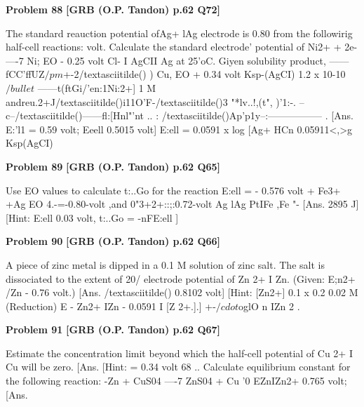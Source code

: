 \begin{problembox}
\textbf{Problem 88} \hfill \textbf{[GRB (O.P. Tandon) p.62 Q72]}
\label{q:ext-grb_all_questions-88}

The standard reauction potential ofAg+ lAg electrode is 0.80 
from the followirig half-cell reactions: 
volt. 
Calculate 
the 
standard 
electrode' potential 
of 
Ni2+ + 2e- ----7 Ni; 
EO 
- 0.25 volt 
Cl- I AgCII Ag 
at 
25'oC. 
Giyen 
solubility 
product, 
------fCC'ffUZ$/pm$+-2/textasciitilde() ) Cu, 
EO 
+ 0.34 volt 
Ksp-(AgCI) 
1.2 x 10-10$/bullet$ 
------t(ftGi/'en:1Ni:2+] \underline{\hspace{1cm}} 1 M andreu.2+J/textasciitilde()i11O'F-/textasciitilde()3 
"*lv..!,(t", )'1:-. --c--/textasciitilde()------fl:[Hnl"'nt .. 
: /textasciitilde()Ap'p1y--:-----------------
. [Ans. E:'l1 = 0.59 volt; Eeell 
0.5015 volt] 
E:ell = 0.0591 x log [Ag+ HCn 0.05911<,>g Ksp(AgCI)
\end{problembox}

\begin{problembox}
\textbf{Problem 89} \hfill \textbf{[GRB (O.P. Tandon) p.62 Q65]}
\label{q:ext-grb_all_questions-89}

Use EO values to calculate t:..Go for the reaction 
E:ell = - 0.576 volt 
+ 
Fe3+ +Ag 
EO 4.-=-0.80-volt ,and  0"3+\underline{\hspace{1cm}}2+::;:\underline{\hspace{1cm}}0.72-volt 
Ag lAg 
PtIFe 
,Fe 
"-
[Ans. 
2895 J] 
[Hint: E:ell 
0.03 volt, t:..Go = -nFE:ell ]
\end{problembox}

\begin{problembox}
\textbf{Problem 90} \hfill \textbf{[GRB (O.P. Tandon) p.62 Q66]}
\label{q:ext-grb_all_questions-90}

A piece of zinc metal is dipped in a 0.1 M solution of zinc salt. 
The salt is dissociated to the extent of 20/%
electrode potential of Zn 2+ I Zn. 
(Given: E;n2+ /Zn 
- 0.76 volt.) 
[Ans. 
/textasciitilde() 0.8102 volt] 
[Hint: 
[Zn2+] 
0.1 x 0.2 
0.02 M 
(Reduction) 
E 
-
Zn2+ IZn -
0.0591 I 
[Z 2+.].] 
+-\underline{\hspace{1cm}}$/cdot$oglO n 
IZn 
2 
.
\end{problembox}

\begin{problembox}
\textbf{Problem 91} \hfill \textbf{[GRB (O.P. Tandon) p.62 Q67]}
\label{q:ext-grb_all_questions-91}

Estimate the concentration limit beyond which the half-cell 
potential of Cu 2+ I Cu will be zero. 
[Ans. 
[Hint: 
= 0.34 volt 
68 .. Calculate equilibrium constant for the following reaction: 
-Zn + CuS04 ----7 ZnS04 + Cu 
'0 
EZnIZn2+ 
0.765 volt; 
[Ans.
\end{problembox}

